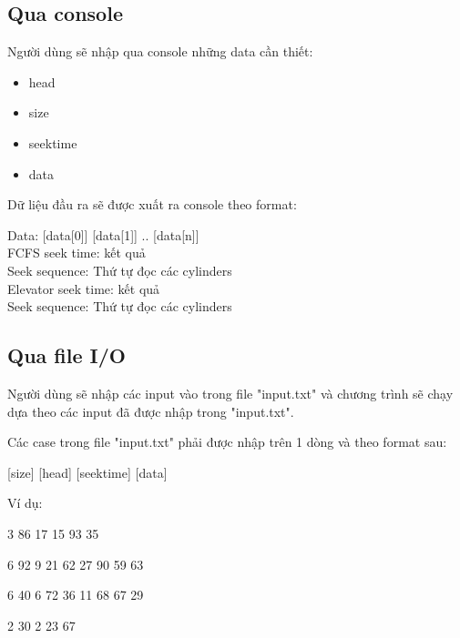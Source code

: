 \documentclass{report}
\begin{document}
        \subsection{Qua console}
            Người dùng sẽ nhập qua console những data cần thiết:
                \begin{itemize}
                    \item head
                    \item size
                    \item seektime
                    \item data
                \end{itemize}

                Dữ liệu đầu ra sẽ được xuất ra console theo format:\\ 
                \begin{tcolorbox}[colback=red!5!white, colframe = red!50!black, title = Console Output]
                    Data: [data[0]] [data[1]] .. [data[n]]\\
                    FCFS seek time: kết quả\\
                    Seek sequence: Thứ tự đọc các cylinders\\
                    Elevator seek time: kết quả\\
                    Seek sequence: Thứ tự đọc các cylinders\\
                \end{tcolorbox}
                
        \subsection{Qua file I/O}
            Người dùng sẽ nhập các input vào trong file "input.txt" và chương trình sẽ chạy dựa theo các input đã được nhập trong "input.txt".

            Các case trong file "input.txt" phải được nhập trên 1 dòng và theo format sau:

            \begin{tcolorbox}[colback=red!5!white, colframe = red!50!black, title = File Input Format]
                    
                [size] [head] [seektime] [data]
            \end{tcolorbox}
            
            Ví dụ:
            \begin{tcolorbox}[colback=gray!5!white,     colframe = gray!50!black, title = input.txt]
                    3 86 17 15 93 35
                    
                    6 92 9 21 62 27 90 59 63
                    
                    6 40 6 72 36 11 68 67 29
                    
                    2 30 2 23 67
            \end{tcolorbox}
\end{document}
